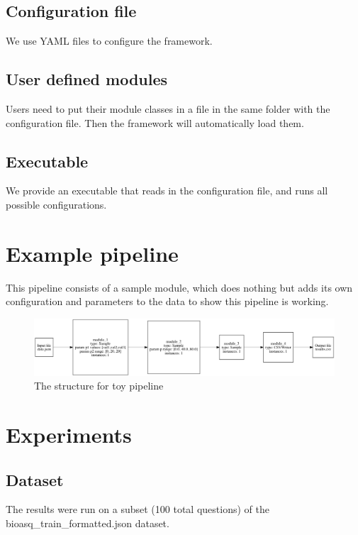 \documentclass{article}
\begin{document}
    \subsection{Configuration file}
    We use YAML files to configure the framework.

    \subsection{User defined modules}
    Users need to put their module classes in a file in the same folder with the configuration file.
    Then the framework will automatically load them.

    \subsection{Executable}
    We provide an executable that reads in the configuration file, and runs all possible configurations.


\section{Example pipeline}
    This pipeline consists of a sample module,
    which does nothing but adds its own configuration and parameters to the data to show this pipeline is working.

    \begin{figure}[H]
        \begin{center}
            \includegraphics[width=1.2\textwidth]{fig/toy_pipeline.png}
        \end{center}
        \label{fig:toy_pipeline}
        \caption{The structure for toy pipeline}
    \end{figure}


\section{Experiments}

    \subsection{Dataset}
    The results were run on a subset (100 total questions) of the bioasq\_train\_formatted.json dataset.
\end{document}
